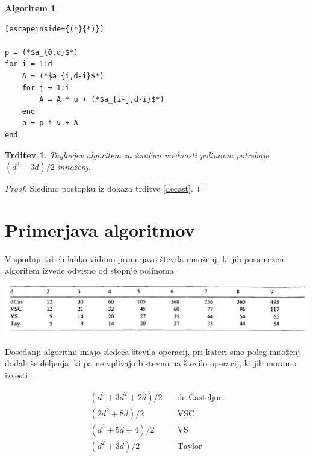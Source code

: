 \documentclass{article}
\newtheorem{algoritm}{Algoritem}[section]
\newtheorem{trditev}{Trditev}[section]
\begin{document}
\begin{algoritm}
\begin{lstlisting}[escapeinside={(*}{*)}]

p = (*$a_{0,d}$*)
for i = 1:d
    A = (*$a_{i,d-i}$*)
    for j = 1:i
        A = A * u + (*$a_{i-j,d-i}$*)
    end
    p = p * v + A
end
\end{lstlisting}
\end{algoritm}

\begin{trditev}
Taylorjev algoritem za izračun vrednosti polinoma potrebuje $(d^2+3d)/2$ množenj.
\end{trditev}

\begin{proof}
Sledimo postopku iz dokaza trditve \ref{decast}.
\end{proof}

\section{Primerjava algoritmov}

V spodnji tabeli lahko vidimo primerjavo števila množenj, ki jih posamezen algoritem izvede odvisno od stopnje polinoma.

\begin{center}
\includegraphics[width=.9\linewidth]{tabelca.PNG}
\end{center}

Dosedanji algoritmi imajo sledeča števila operacij, pri kateri smo poleg množenj dodali še deljenja, ki pa ne vplivajo bistevno na število operacij, ki jih moramo izvesti.

\begin{align}
(d^3+3d^2+2d)/2& \quad \text{de Casteljou} \nonumber \\
(2d^2+8d)/2& \quad \text{VSC} \nonumber \\
(d^2+5d+4)/2& \quad \text{VS} \nonumber \\
(d^2+3d)/2& \quad \text{Taylor} \nonumber
\end{align}
\end{document}
